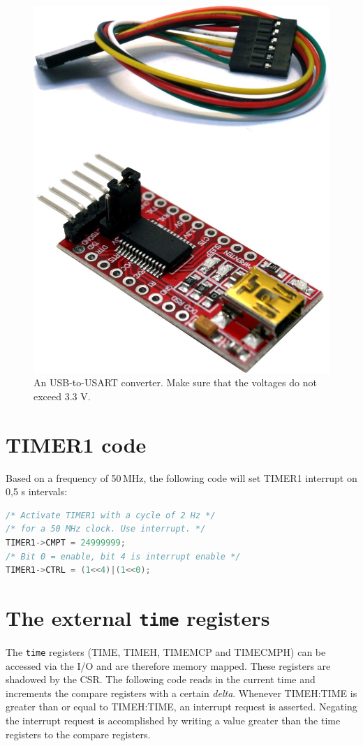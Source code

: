 \documentclass[12pt]{article}
\begin{document}
\begin{figure}[!ht]
\centering
\includegraphics[scale=0.1]{usb-usart-ttl}
\caption{An USB-to-USART converter. Make sure that the voltages do not exceed 3.3 V.}
\label{fig:usb-usart-ttl}
\end{figure}


\section{TIMER1 code}
Based on a frequency of 50$\,$MHz, the following code will set TIMER1 interrupt on 0,5 s intervals:

\begin{lstlisting}[language=C]
/* Activate TIMER1 with a cycle of 2 Hz */
/* for a 50 MHz clock. Use interrupt. */
TIMER1->CMPT = 24999999;
/* Bit 0 = enable, bit 4 is interrupt enable */
TIMER1->CTRL = (1<<4)|(1<<0);
\end{lstlisting}

\section{The external \texttt{time} registers}
The \texttt{time} registers (TIME, TIMEH, TIMEMCP and TIMECMPH) can be accessed via the I/O and are therefore memory mapped. These registers are shadowed by the CSR. The following code reads in the current time and increments the compare registers with a certain \emph{delta}. Whenever TIMEH:TIME is greater than or equal to TIMEH:TIME, an interrupt request is asserted. Negating the interrupt request is accomplished by writing a value greater than the time registers to the compare registers.
\end{document}
